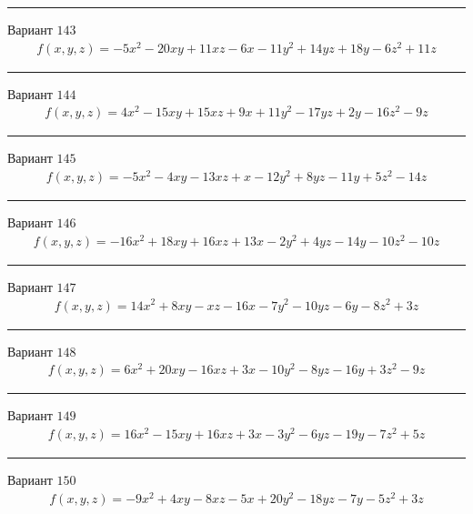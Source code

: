 \documentclass[11pt]{report}
\begin{document}
\begin{center}
\noindent\rule{8cm}{0.4pt}
\end{center}
Вариант $143$
\begin{align*}
    f(x, y, z) = - 5 x^{2} - 20 x y + 11 x z - 6 x - 11 y^{2} + 14 y z + 18 y - 6 z^{2} + 11 z
\end{align*}
\begin{center}
\noindent\rule{8cm}{0.4pt}
\end{center}
Вариант $144$
\begin{align*}
    f(x, y, z) = 4 x^{2} - 15 x y + 15 x z + 9 x + 11 y^{2} - 17 y z + 2 y - 16 z^{2} - 9 z
\end{align*}
\begin{center}
\noindent\rule{8cm}{0.4pt}
\end{center}
Вариант $145$
\begin{align*}
    f(x, y, z) = - 5 x^{2} - 4 x y - 13 x z + x - 12 y^{2} + 8 y z - 11 y + 5 z^{2} - 14 z
\end{align*}
\begin{center}
\noindent\rule{8cm}{0.4pt}
\end{center}
Вариант $146$
\begin{align*}
    f(x, y, z) = - 16 x^{2} + 18 x y + 16 x z + 13 x - 2 y^{2} + 4 y z - 14 y - 10 z^{2} - 10 z
\end{align*}
\begin{center}
\noindent\rule{8cm}{0.4pt}
\end{center}
Вариант $147$
\begin{align*}
    f(x, y, z) = 14 x^{2} + 8 x y - x z - 16 x - 7 y^{2} - 10 y z - 6 y - 8 z^{2} + 3 z
\end{align*}
\begin{center}
\noindent\rule{8cm}{0.4pt}
\end{center}
Вариант $148$
\begin{align*}
    f(x, y, z) = 6 x^{2} + 20 x y - 16 x z + 3 x - 10 y^{2} - 8 y z - 16 y + 3 z^{2} - 9 z
\end{align*}
\begin{center}
\noindent\rule{8cm}{0.4pt}
\end{center}
Вариант $149$
\begin{align*}
    f(x, y, z) = 16 x^{2} - 15 x y + 16 x z + 3 x - 3 y^{2} - 6 y z - 19 y - 7 z^{2} + 5 z
\end{align*}
\begin{center}
\noindent\rule{8cm}{0.4pt}
\end{center}
Вариант $150$
\begin{align*}
    f(x, y, z) = - 9 x^{2} + 4 x y - 8 x z - 5 x + 20 y^{2} - 18 y z - 7 y - 5 z^{2} + 3 z
\end{align*}
\end{document}
